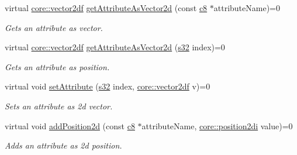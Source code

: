 \begin{DoxyCompactItemize}
virtual \hyperlink{namespaceirr_1_1core_a116f90bd31515724b6235014ee2b74d5}{core\+::vector2df} \hyperlink{classirr_1_1io_1_1IAttributes_a047461734c2eb9e3f1b68a4278a0d24b}{get\+Attribute\+As\+Vector2d} (const \hyperlink{namespaceirr_a9395eaea339bcb546b319e9c96bf7410}{c8} $\ast$attribute\+Name)=0
\begin{DoxyCompactList}\small\item\em Gets an attribute as vector. \end{DoxyCompactList}\item 
virtual \hyperlink{namespaceirr_1_1core_a116f90bd31515724b6235014ee2b74d5}{core\+::vector2df} \hyperlink{classirr_1_1io_1_1IAttributes_a81fb2a12345e49b12cd6cf05968544f5}{get\+Attribute\+As\+Vector2d} (\hyperlink{namespaceirr_ac66849b7a6ed16e30ebede579f9b47c6}{s32} index)=0
\begin{DoxyCompactList}\small\item\em Gets an attribute as position. \end{DoxyCompactList}\item 
\mbox{\label{classirr_1_1io_1_1IAttributes_a10fd4234098fbdbc53c1a2e32fb370f2}} 
virtual void \hyperlink{classirr_1_1io_1_1IAttributes_a10fd4234098fbdbc53c1a2e32fb370f2}{set\+Attribute} (\hyperlink{namespaceirr_ac66849b7a6ed16e30ebede579f9b47c6}{s32} index, \hyperlink{namespaceirr_1_1core_a116f90bd31515724b6235014ee2b74d5}{core\+::vector2df} v)=0
\begin{DoxyCompactList}\small\item\em Sets an attribute as 2d vector. \end{DoxyCompactList}\item 
\mbox{\label{classirr_1_1io_1_1IAttributes_ae875ea8d21955b4945b3d2d4f6e739fe}} 
virtual void \hyperlink{classirr_1_1io_1_1IAttributes_ae875ea8d21955b4945b3d2d4f6e739fe}{add\+Position2d} (const \hyperlink{namespaceirr_a9395eaea339bcb546b319e9c96bf7410}{c8} $\ast$attribute\+Name, \hyperlink{namespaceirr_1_1core_ace0f1379db5f9f5660456ec57ab78202}{core\+::position2di} value)=0
\begin{DoxyCompactList}\small\item\em Adds an attribute as 2d position. \end{DoxyCompactList}\item 
\mbox{\label{classirr_1_1io_1_1IAttributes_abd4c30bfab5a3755682b9fc902b04310}} 

\end{DoxyCompactItemize}
